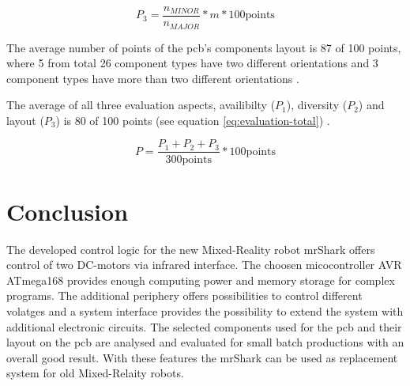 \documentclass{acm_proc_article-sp}
\begin{document}
\begin{equation}
\label{eq:component-layout}
P_{3} = \frac{n_{MINOR}}{n_{MAJOR}}*m*100 \text{points}
\end{equation}

The average number of points of the pcb's components layout is 87 of 100 points,
where 5 from total 26 component types have two different orientations and 3
component types have more than two different orientations \cite{eilers:13}.

The average of all three evaluation aspects, availibilty ($P_{1}$), diversity
($P_{2}$) and layout ($P_{3}$) is 80 of 100 points (see equation
\ref{eq:evaluation-total}) \cite{eilers:13}.

\begin{equation}
\label{eq:evaluation-total}
P = \frac{ P_{1} + P_{2} + P_{3} }{ 300 \text{points} } * 100 \text{points}
\end{equation}

\section{Conclusion}
The developed control logic for the new Mixed-Reality robot mrShark offers
control of two DC-motors via infrared interface. The choosen micocontroller AVR
ATmega168 provides enough computing power and memory storage for complex
programs. The additional periphery offers possibilities to control different
volatges and a system interface provides the possibility to extend the system
with additional electronic circuits. The selected components used for the pcb and
their layout on the pcb are analysed and evaluated for small batch productions
with an overall good result. With these features the mrShark can be used as
replacement system for old Mixed-Relaity robots.


%

%
\end{document}
